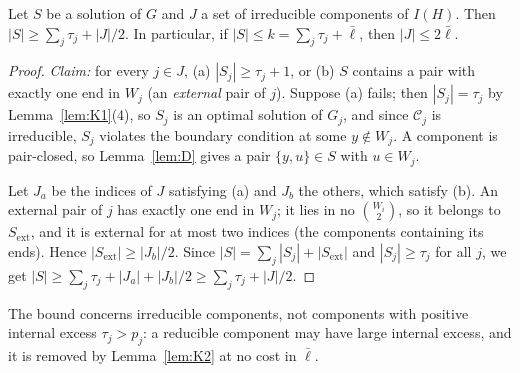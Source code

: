 \begin{lemma}\label{lem:count}
Let $S$ be a solution of $G$ and $J$ a set of irreducible components of $I(H)$. Then $|S|\ge\sum_j\tau_j+|J|/2$. In particular, if $|S|\le k=\sum_j\tau_j+\bar\ell$, then $|J|\le2\bar\ell$.
\end{lemma}
\begin{proof}
\emph{Claim:} for every $j\in J$, (a) $|S_j|\ge\tau_j+1$, or (b) $S$ contains a pair with exactly one end in $W_j$ (an \emph{external} pair of $j$). Suppose (a) fails; then $|S_j|=\tau_j$ by Lemma~\ref{lem:K1}(4), so $S_j$ is an optimal solution of $G_j$, and since $\mathcal C_j$ is irreducible, $S_j$ violates the boundary condition at some $y\notin W_j$. A component is pair-closed, so Lemma~\ref{lem:D} gives a pair $\{y,u\}\in S$ with $u\in W_j$.

Let $J_a$ be the indices of $J$ satisfying (a) and $J_b$ the others, which satisfy (b). An external pair of $j$ has exactly one end in $W_j$; it lies in no $\binom{W_i}2$, so it belongs to $S_{\mathrm{ext}}$, and it is external for at most two indices (the components containing its ends). Hence $|S_{\mathrm{ext}}|\ge|J_b|/2$. Since $|S|=\sum_j|S_j|+|S_{\mathrm{ext}}|$ and $|S_j|\ge\tau_j$ for all $j$, we get $|S|\ge\sum_j\tau_j+|J_a|+|J_b|/2\ge\sum_j\tau_j+|J|/2$.
\end{proof}
The bound concerns irreducible components, not components with positive internal excess $\tau_j>p_j$: a reducible component may have large internal excess, and it is removed by Lemma~\ref{lem:K2} at no cost in $\bar\ell$.

